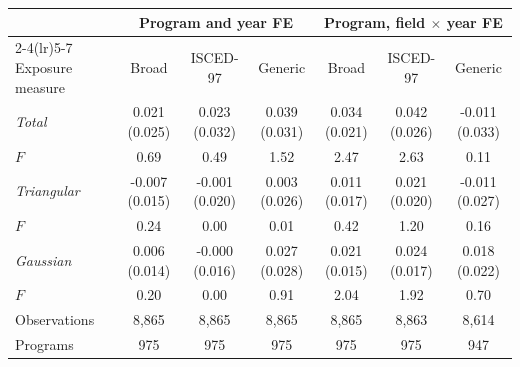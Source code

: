 \begin{tabular}{lcccccc}
\toprule
 & \multicolumn{3}{c}{Program and year FE} & \multicolumn{3}{c}{Program, field \(\times\) year FE} \\
\cmidrule(lr){2-4}\cmidrule(lr){5-7}
Exposure measure & Broad & ISCED-97 & Generic & Broad & ISCED-97 & Generic \\
\midrule
\textit{Total} &  0.021 (0.025) &  0.023 (0.032) &  0.039 (0.031) &  0.034 (0.021) &  0.042 (0.026) & -0.011 (0.033) \\
\quad \(F\) &  0.69 &  0.49 &  1.52 &  2.47 &  2.63 &  0.11 \\
\addlinespace
\textit{Triangular} & -0.007 (0.015) & -0.001 (0.020) &  0.003 (0.026) &  0.011 (0.017) &  0.021 (0.020) & -0.011 (0.027) \\
\quad \(F\) &  0.24 &  0.00 &  0.01 &  0.42 &  1.20 &  0.16 \\
\addlinespace
\textit{Gaussian} &  0.006 (0.014) & -0.000 (0.016) &  0.027 (0.028) &  0.021 (0.015) &  0.024 (0.017) &  0.018 (0.022) \\
\quad \(F\) &  0.20 &  0.00 &  0.91 &  2.04 &  1.92 &  0.70 \\
\midrule
Observations &     8,865 &     8,865 &     8,865 &     8,865 &     8,863 &     8,614 \\
Programs &       975 &       975 &       975 &       975 &       975 &       947 \\
\bottomrule
\end{tabular}
